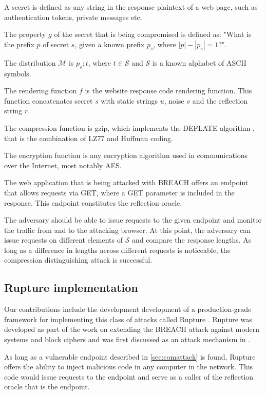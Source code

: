 \documentclass{sig-alternate-05-2015}
\begin{document}
A secret is defined as any string in the response plaintext of a web page, such
as authentication tokens, private messages etc.

The property $g$ of the secret that is being compromised is defined as: "What is
the prefix $p$ of secret $s$, given a known prefix $p_s$, where $|p| - |p_s| =
1$?".

The distribution $\mathcal{M}$ is ${p_s:t}$, where $t \in \mathcal{S}$ and
$\mathcal{S}$ is a known alphabet of ASCII symbols.

The rendering function $f$ is the website response code rendering function. This
function concatenates secret $s$ with static strings $u$, noise $v$ and the
reflection string $r$.

The compression function is gzip, which implements the DEFLATE algorithm
\cite{c10}, that is the combination of LZ77 and Huffman coding.

The encryption function is any encryption algorithm used in communications over
the Internet, most notably AES.

The web application that is being attacked with BREACH offers an endpoint that
allows requests via GET, where a GET parameter is included in the response. This
endpoint constitutes the reflection oracle.

The adversary should be able to issue requests to the given endpoint and monitor
the traffic from and to the attacking browser. At this point, the adversary can
issue requests on different elements of $\mathcal{S}$ and compare the response lengths. As
long as a difference in lengths across different requests is noticeable, the
compression distinguishing attack is successful.

\subsection{Rupture implementation}\label{subsec:rupture}
Our contributions include the development development of a production-grade
framework for implementing this class of attacks called Rupture \cite{c11}.
Rupture was developed as part of the work on extending the BREACH attack against
modern systems and block ciphers and was first discussed as an attack mechanism
in \cite{c12}.

As long as a vulnerable endpoint described in \ref{sec:comattack} is found,
Rupture offers the ability to inject malicious code in any computer in the
network. This code would issue requests to the endpoint and serve as a caller of
the reflection oracle that is the endpoint.
\end{document}
